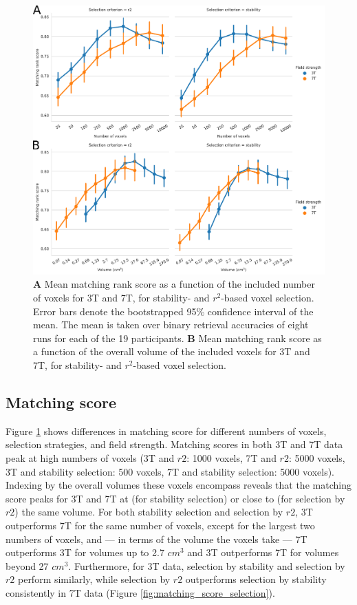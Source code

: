 \begin{figure}
  \centering
    \includegraphics[width=\linewidth]{pics/rank.pdf}
	
  \caption{\textbf{A} Mean matching rank score as a function of the included number
  of voxels for 3T and 7T, for stability- and $r^2$-based voxel selection.
  Error bars denote the bootstrapped 95\% confidence interval of the mean. The
  mean is taken over binary retrieval accuracies of eight runs for each of the
  19 participants. \textbf{B} Mean matching rank score as a function of the overall
volume of the included voxels for 3T and 7T, for stability- and
$r^2$-based voxel selection.}

 \label{fig:matching_score}
\end{figure}

\subsection*{Matching score}

Figure \ref{fig:matching_score} shows differences in matching score
for different numbers of voxels, selection strategies, and field strength.
Matching scores in both 3T and 7T data peak at high numbers of voxels (3T and
$r2$: 1000 voxels, 7T and $r2$: 5000 voxels, 3T and stability selection: 500
voxels, 7T and stability selection: 5000 voxels).
Indexing by the overall volumes these voxels encompass reveals that the matching
score peaks for 3T and 7T at (for stability selection) or close to (for
selection by $r2$) the same volume.
For both stability selection and selection by $r2$, 3T outperforms 7T for the
same number of voxels, except for the largest two numbers of voxels, and --- in
terms of the volume the voxels take --- 7T outperforms 3T for volumes up to 2.7
$cm^{3}$ and 3T outperforms 7T for volumes beyond 27 $cm^{3}$.
Furthermore, for 3T data, selection by stability and selection by $r2$ perform
similarly, while selection by $r2$ outperforms selection by stability
consistently in 7T data (Figure \ref{fig:matching_score_selection}).

